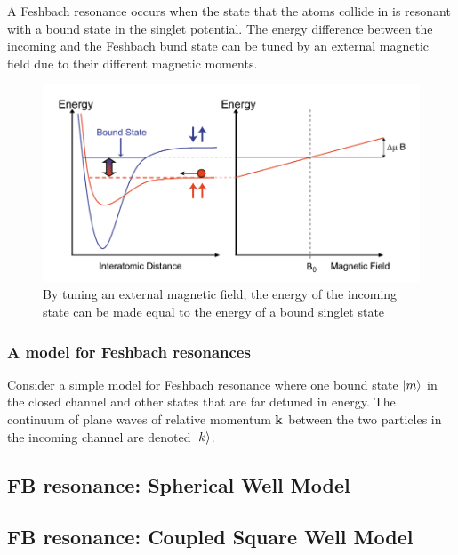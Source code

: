 \documentclass{book}
\theoremstyle{definition}
\begin{document}
\begin{framed}
A Feshbach resonance occurs when the state that the atoms collide in is resonant with a bound state in the singlet potential. The energy difference between the incoming and the Feshbach bund state can be tuned by an external magnetic field due to their different magnetic moments. 
\end{framed}


\begin{figure}[!htb]
	\centering
	\includegraphics[scale=0.5]{figures/FB_res.png}
	\caption{By tuning an external magnetic field, the energy of the incoming state can be made equal to the energy of a bound singlet state}
\end{figure}


\subsubsection{A model for Feshbach resonances}

Consider a simple model for Feshbach resonance where one bound state $\ket{m}$ in the closed channel and other states that are far detuned in energy. The continuum of plane waves of relative momentum $\bf{k}$ between the two particles in the incoming channel are denoted $\ket{k}$. 





\subsection{FB resonance: Spherical Well Model}

\subsection{FB resonance: Coupled Square Well Model}
\end{document}
